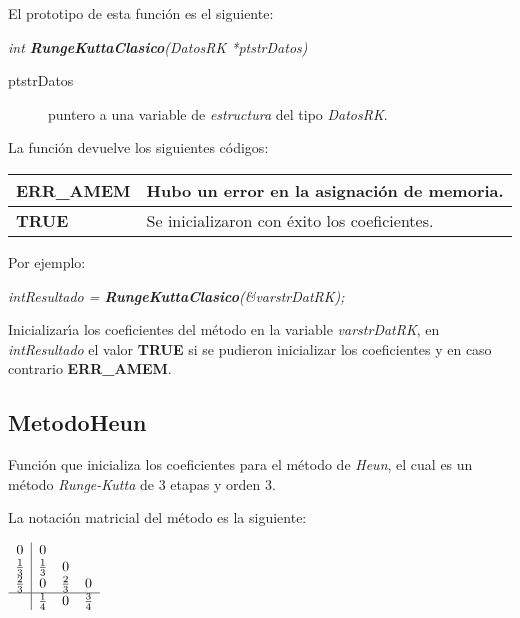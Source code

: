 El prototipo de esta funci\'on es el siguiente:

\begin{center}
\emph{int \textbf{RungeKuttaClasico}(DatosRK *ptstrDatos)}
\end{center}

\begin{description}
\item[ptstrDatos] puntero a una variable de \emph{estructura} del tipo
\emph{DatosRK}.
\end{description}

La funci\'on devuelve los siguientes c\'odigos:

\begin{center}
\begin{tabular}{|l|l|}
\hline
\textbf{ERR\_AMEM} & Hubo un error en la asignaci\'on de memoria. \\
\hline
\textbf{TRUE} & Se inicializaron con \'exito los coeficientes. \\
\hline
\end{tabular}
\end{center}

Por ejemplo:

\begin{center}
\emph{intResultado = \textbf{RungeKuttaClasico}(\&varstrDatRK);}
\end{center}

Inicializar\'{\i}a los coeficientes del m\'etodo en la variable 
\emph{varstrDatRK}, en \emph{intResultado} el valor \textbf{TRUE} si se pudieron
inicializar los coeficientes y en caso contrario \textbf{ERR\_AMEM}.

\subsection{MetodoHeun}
Funci\'on que inicializa los coeficientes para el m\'etodo de \emph{Heun}, el
cual es un m\'etodo \emph{Runge-Kutta} de $3$ etapas y orden $3$.\newline

La notaci\'on matricial del m\'etodo es la siguiente:

\begin{center}
$
\begin{array}{c|ccc}
0 & 0 \\
\frac{1}{3} & \frac{1}{3} & 0 \\
\frac{2}{3} & 0 & \frac{2}{3} & 0 \\
\hline
 & \frac{1}{4} & 0 & \frac{3}{4}
\end{array}
$
\end{center}

